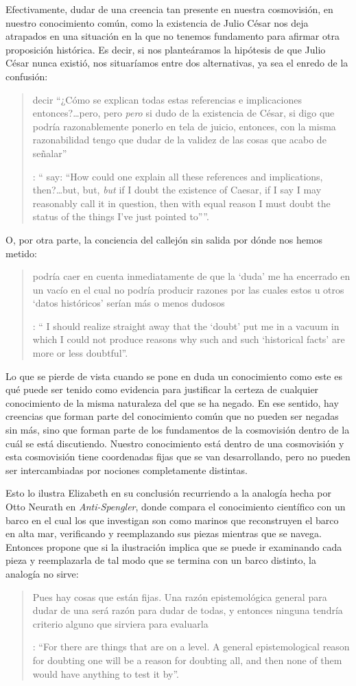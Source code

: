 Efectivamente, dudar de una creencia tan presente en nuestra cosmovisión, en nuestro conocimiento común, como la existencia de Julio César nos deja atrapados en una situación en la que no tenemos fundamento para afirmar otra proposición histórica. Es decir, si nos planteáramos la hipótesis de que Julio César nunca existió, nos situaríamos entre dos alternativas, ya sea el enredo de la confusión: \blockquote[{\Cite[91]{anscombe1981parmenides:humeandjulius}}: \enquote{\textelp{} say: ``How could one explain all these references and implications, then?\ldots but, but, \emph{but} if I doubt the existence of Caesar, if I say I may reasonably call it in question, then with equal reason I must doubt the status of the things I've just pointed to''}.]{\textelp{} decir ``¿Cómo se explican todas estas referencias e implicaciones entonces?\ldots pero, pero \emph{pero} si dudo de la existencia de César, si digo que podría razonablemente ponerlo en tela de juicio, entonces, con la misma razonabilidad tengo que dudar de la validez de las cosas que acabo de señalar''}. O, por otra parte, la conciencia del callejón sin salida por dónde nos hemos metido: \blockquote[{\Cite[91]{anscombe1981parmenides:humeandjulius}}: \enquote{\textelp{} I should realize straight away that the `doubt' put me in a vacuum in which I could not produce reasons why such and such `historical facts' are more or less doubtful}.]{\textelp{} podría caer en cuenta inmediatamente de que la `duda' me ha encerrado en un vacío en el cual no podría producir razones por las cuales estos u otros `datos históricos' serían más o menos dudosos}.

Lo que se pierde de vista cuando se pone en duda un conocimiento como este es qué puede ser tenido como evidencia para justificar la certeza de cualquier conocimiento de la misma naturaleza del que se ha negado. En ese sentido, hay creencias que forman parte del conocimiento común que no pueden ser negadas sin más, sino que forman parte de los fundamentos de la cosmovisión dentro de la cuál se está discutiendo. Nuestro conocimiento está dentro de una cosmovisión y esta cosmovisión tiene coordenadas fijas que se van desarrollando, pero no pueden ser intercambiadas por nociones completamente distintas.

Esto lo ilustra Elizabeth en su conclusión recurriendo a la analogía hecha por Otto Neurath en \emph{Anti-Spengler}, donde compara el conocimiento científico con un barco en el cual los que investigan son como marinos que reconstruyen el barco en alta mar, verificando y reemplazando sus piezas mientras que se navega. Entonces propone que si la ilustración implica que se puede ir examinando cada pieza y reemplazarla de tal modo que se termina con un barco distinto, la analogía no sirve: \blockquote[{\Cite[92]{anscombe1981parmenides:humeandjulius}}: \enquote{For there are things that are on a level. A general epistemological reason for doubting one will be a reason for doubting all, and then none of them would have anything to test it by}.]{Pues hay cosas que están fijas. Una razón epistemológica general para dudar de una será razón para dudar de todas, y entonces ninguna tendría criterio alguno que sirviera para evaluarla}.
